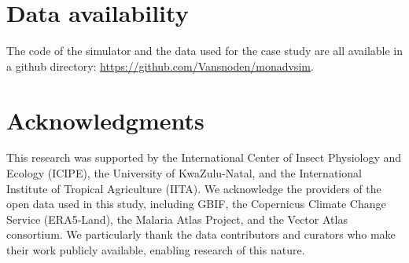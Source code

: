 \documentclass{article}
\begin{document}
\section*{Data availability}
\label{sec:data_availability}
The code of the simulator and the data used for the case study are all available in a github directory:
\url{https://github.com/Vansnoden/monadvsim}.


\section*{Acknowledgments}
\par
This research was supported by the International Center of Insect Physiology and Ecology (ICIPE), 
the University of KwaZulu-Natal, and the International Institute of Tropical Agriculture (IITA). 
We acknowledge the providers of the open data used in this study, including GBIF, the Copernicus 
Climate Change Service (ERA5-Land), the Malaria Atlas Project, and the Vector Atlas consortium. 
We particularly thank the data contributors and curators who make their work publicly available, 
enabling research of this nature.




\end{document}
